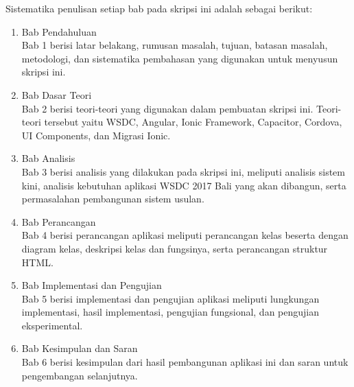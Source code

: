 Sistematika penulisan setiap bab pada skripsi ini adalah sebagai berikut:
\begin{enumerate}
	\item Bab Pendahuluan \\
	Bab 1 berisi latar belakang, rumusan masalah, tujuan, batasan masalah, metodologi, dan sistematika pembahasan yang digunakan untuk menyusun skripsi ini.
	\item Bab Dasar Teori \\
	Bab 2 berisi teori-teori yang digunakan dalam pembuatan skripsi ini. Teori-teori tersebut yaitu WSDC, Angular, Ionic Framework, Capacitor, Cordova, UI Components, dan Migrasi Ionic.
	\item Bab Analisis \\
	Bab 3 berisi analisis yang dilakukan pada skripsi ini, meliputi analisis sistem kini, analisis kebutuhan aplikasi WSDC 2017 Bali yang akan dibangun, serta permasalahan pembangunan sistem usulan.
	\item Bab Perancangan \\
	Bab 4 berisi perancangan aplikasi meliputi perancangan kelas beserta dengan diagram kelas, deskripsi kelas dan fungsinya, serta perancangan struktur HTML.
	\item Bab Implementasi dan Pengujian \\
	Bab 5 berisi implementasi dan pengujian aplikasi meliputi lungkungan implementasi, hasil implementasi, pengujian fungsional, dan pengujian eksperimental.
	\item Bab Kesimpulan dan Saran \\
	Bab 6 berisi kesimpulan dari hasil pembangunan aplikasi ini dan saran untuk pengembangan selanjutnya.
	\end{enumerate}